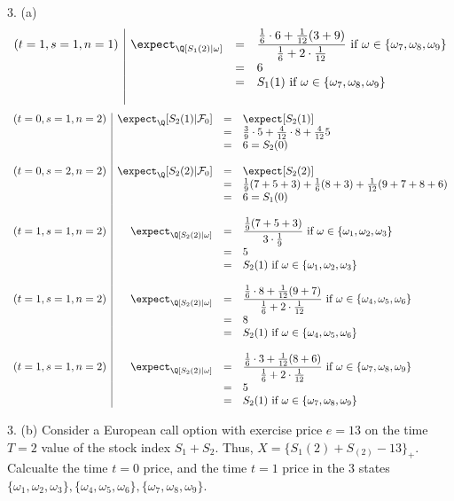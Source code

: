 \documentclass[11pt,a4paper]{article}
\begin{document}
\begin{answer}{3. (a)}
\[\begin{array}{r|rcl}
    (t=1,s=1,n=1)&\expect_\Q[S_1(2)|\omega]&=&\dfrac{\frac16\cdot 6+\frac1{12}(3+9)}{\frac16+2\cdot\frac1{12}}\text{ if }\omega\in\{\omega_7,\omega_8,\omega_9\}\\
    &&=&6\\
    &&=&S_1(1)\text{ if }\omega\in\{\omega_7,\omega_8,\omega_9\}\\\\
  \end{array}\]
  \[\begin{array}{r|rcl}
    (t=0,s=1,n=2)&\expect_\Q[S_2(1)|\mathcal{F}_0]&=&\expect[S_2(1)]\\
    &&=&\frac39\cdot5+\frac4{12}\cdot8+\frac4{12}5\\
    &&=&6=S_2(0)\\\\

    (t=0,s=2,n=2)&\expect_\Q[S_2(2)|\mathcal{F}_0]&=&\expect[S_2(2)]\\
    &&=&\frac19(7+5+3)+\frac16(8+3)+\frac1{12}(9+7+8+6)\\
    &&=&6=S_1(0)\\\\

    (t=1,s=1,n=2)&\expect_\Q[S_2(2)|\omega]&=&\dfrac{\frac19(7+5+3)}{3\cdot\frac19}\text{ if }\omega\in\{\omega_1,\omega_2,\omega_3\}\\
    &&=&5\\
    &&=&S_2(1)\text{ if }\omega\in\{\omega_1,\omega_2,\omega_3\}\\\\

    (t=1,s=1,n=2)&\expect_\Q[S_2(2)|\omega]&=&\dfrac{\frac16\cdot 8+\frac1{12}(9+7)}{\frac16+2\cdot\frac1{12}}\text{ if }\omega\in\{\omega_4,\omega_5,\omega_6\}\\
    &&=&8\\
    &&=&S_2(1)\text{ if }\omega\in\{\omega_4,\omega_5,\omega_6\}\\\\

    (t=1,s=1,n=2)&\expect_\Q[S_2(2)|\omega]&=&\dfrac{\frac16\cdot 3+\frac1{12}(8+6)}{\frac16+2\cdot\frac1{12}}\text{ if }\omega\in\{\omega_7,\omega_8,\omega_9\}\\
    &&=&5\\
    &&=&S_2(1)\text{ if }\omega\in\{\omega_7,\omega_8,\omega_9\}
  \end{array}\]
\end{answer}

\begin{question}{3. (b)}
  Consider a European call option with exercise price $e=13$ on the time $T=2$ value of the stock index $S_1+S_2$. Thus,  $X=\{S_1(2)+S_(2)-13\}_+$. Calcualte the time $t=0$ price, and the time $t=1$ price in the 3 states $\{\omega_1,\omega_2,\omega_3\},\{\omega_4,\omega_5,\omega_6\},\{\omega_7,\omega_8,\omega_9\}$.
\end{question}
\end{document}
